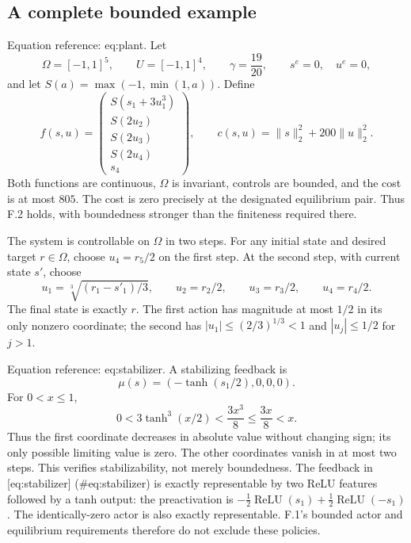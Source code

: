 \documentclass[10pt]{article}
\begin{document}
\subsection*{A complete bounded example}
Equation reference: eq:plant. Let \[\Omega=[-1,1]^5,\qquad U=[-1,1]^4,\qquad
 \gamma=\frac{19}{20},\qquad s^e=0,\quad u^e=0,\] and let \(S(a)=\max(-1,\min(1,a))\). Define \[
 f(s,u)=
 \begin{pmatrix}
 S(s_1+3u_1^3)\\
 S(2u_2)\\
 S(2u_3)\\
 S(2u_4)\\
 s_4
 \end{pmatrix},
 \qquad
 c(s,u)=\|s\|_2^2+200\|u\|_2^2.\] Both functions are continuous, \(\Omega\) is invariant, controls are bounded, and the cost is at most \(805\). The cost is zero precisely at the designated equilibrium pair. Thus F.2 holds, with boundedness stronger than the finiteness required there.\par
The system is controllable on \(\Omega\) in two steps. For any initial state and desired target \(r\in\Omega\), choose \(u_4=r_5/2\) on the first step. At the second step, with current state \(s'\), choose \[u_1=\sqrt[3]{(r_1-s'_1)/3},\qquad
 u_2=r_2/2,\qquad u_3=r_3/2,\qquad u_4=r_4/2.\] The final state is exactly \(r\). The first action has magnitude at most \(1/2\) in its only nonzero coordinate; the second has \(|u_1|\le(2/3)^{1/3}<1\) and \(|u_j|\le1/2\) for \(j>1\).\par
Equation reference: eq:stabilizer. A stabilizing feedback is \[
 \mu(s)=(-\tanh(s_1/2),0,0,0).\] For \(0<x\le1\), \[0<3\tanh^3(x/2)<\frac{3x^3}{8}\le\frac{3x}{8}<x.\] Thus the first coordinate decreases in absolute value without changing sign; its only possible limiting value is zero. The other coordinates vanish in at most two steps. This verifies stabilizability, not merely boundedness. The feedback in [eq:stabilizer] (\#eq:stabilizer) is exactly representable by two ReLU features followed by a tanh output: the preactivation is \(-\tfrac12\operatorname{ReLU}(s_1)+\tfrac12\operatorname{ReLU}(-s_1)\). The identically-zero actor is also exactly representable. F.1’s bounded actor and equilibrium requirements therefore do not exclude these policies.\par
\end{document}
